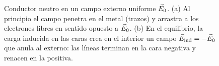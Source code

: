 \begin{figure}[t]
\caption{Conductor neutro en un campo externo uniforme $\vec{E}_0$. (a) Al principio el campo penetra en el metal (trazos) y arrastra a los
electrones libres en sentido opuesto a $\vec{E}_0$. (b) En el equilibrio, la carga inducida en las caras crea en el interior un campo
$\vec{E}_{\mathrm{ind}}=-\vec{E}_0$ que anula al externo: las líneas terminan en la cara negativa y renacen en la positiva.}
\label{fig:placa}
\end{figure}
